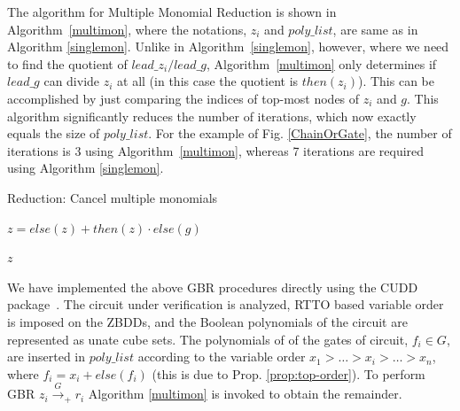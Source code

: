 The algorithm for Multiple Monomial Reduction is shown in
Algorithm~\ref{multimon}, where the notations, $z_i$ and $poly\_list$,
are same as in Algorithm \ref{singlemon}. Unlike in
Algorithm~\ref{singlemon}, however, where we need to find the quotient of
$lead\_z_i/lead\_g$, Algorithm~\ref{multimon} only determines if
$lead\_g$ can divide $z_i$ at all (in this case the quotient is
$then(z_i)$). This can be accomplished by just comparing the indices of
top-most nodes of $z_i$ and $g$. This algorithm significantly reduces
the number of iterations, which now exactly equals the size of
$poly\_list$. For the example of Fig. \ref{ChainOrGate}, the number
of iterations is 3 using Algorithm~\ref{multimon}, whereas 7
iterations are required using Algorithm \ref{singlemon}. 

\begin{algorithm}
\caption{Reduction: Cancel multiple monomials}
\label{multimon}
\begin{algorithmic}[1]
{\small
{}

\State $z = else(z) + then(z)\cdot else(g)$
\EndIf

\EndFor
\State \Return $z$
\EndProcedure
}
\end{algorithmic}
\end{algorithm}



We have implemented the above GBR procedures directly using the CUDD
package~\cite{cudd}. The circuit under verification is analyzed, RTTO based
variable order is imposed on the ZBDDs, and the Boolean polynomials of
the circuit are represented as unate cube sets. 
The polynomials of of the gates of circuit, $f_i \in G$, are
inserted in $poly\_list$ according to the variable order $x_1 > \dots
> x_i > \dots > x_n$, where $f_i = x_i + else(f_i)$ (this is due to
Prop. \ref{prop:top-order}). To perform GBR $z_i\xrightarrow{G}_+ r_i$
Algorithm \ref{multimon} is invoked to obtain the remainder. 
